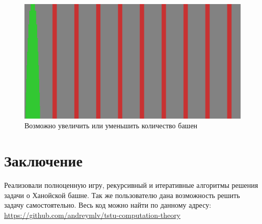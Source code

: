 \begin{figure}[H]
	\begin{center}
		\includegraphics[width=\textwidth]{images/many_towers.png}
		\caption{Возможно увеличить или уменьшить количество башен}
	\end{center}
\end{figure}

\section*{Заключение}
Реализовали полноценную игру, рекурсивный и итеративные алгоритмы решения
задачи о Ханойской башне. Так же пользователю дана возможность решить задачу
самостоятельно. Весь код можно найти по данному адресу: \url{https://github.com/andreymlv/tstu-computation-theory}
